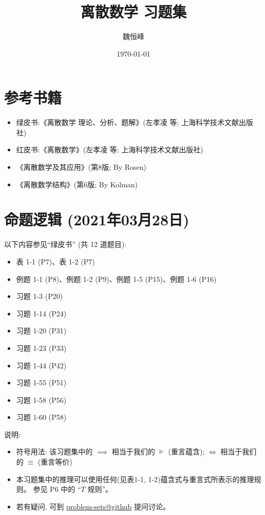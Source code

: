 \documentclass{article}
\title{离散数学 习题集}
\author{魏恒峰}
\date{\today}
\begin{document}
\maketitle
\section*{参考书籍}

\begin{itemize}
  \item 绿皮书:《离散数学 理论、分析、题解》(左孝凌 等; 上海科学技术文献出版社)
  \item 红皮书:《离散数学》(左孝凌 等; 上海科学技术文献出版社)
  \item《离散数学及其应用》(第8版; By Rosen)
  \item《离散数学结构》(第6版; By Kolman)
\end{itemize}
\section{命题逻辑 (2021年03月28日)}

以下内容参见``绿皮书'' (共 12 道题目):
\begin{itemize}
  \item 表 1-1 (P7)、表 1-2 (P7)
  \item 例题 1-1 (P8)、例题 1-2 (P9)、例题 1-5 (P15)、例题 1-6 (P16)
  \item 习题 1-3 (P20)
  \item 习题 1-14 (P24)
  \item 习题 1-20 (P31)
  \item 习题 1-23 (P33)
  \item 习题 1-44 (P42)
  \item 习题 1-55 (P51)
  \item 习题 1-58 (P56)
  \item 习题 1-60 (P58)
\end{itemize}

说明:
\begin{itemize}
  \item 符号用法: 该习题集中的 $\implies$ 相当于我们的 $\models$ (重言蕴含);
    $\iff$ 相当于我们的 $\equiv$ (重言等价)
  \item 本习题集中的推理可以使用任何(见表1-1, 1-2)蕴含式与重言式所表示的推理规则。
    参见 P6 中的 ``$T$ 规则''。
  \item 若有疑问, 可到 \href{https://github.com/courses-at-nju-by-hfwei/discrete-math-problem-sets/discussions}{problem-sets@github} 提问讨论。
\end{itemize}
\end{document}
